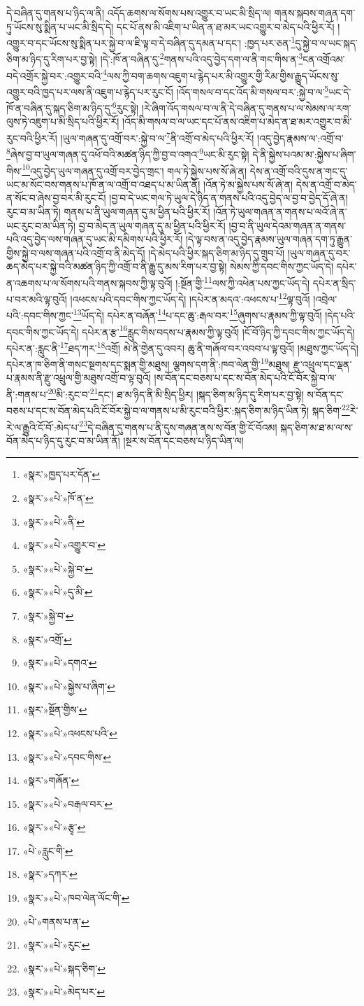 དེ་བཞིན་དུ་གནས་པ་ཉིད་ལ་ནི། འདོད་ཆགས་ལ་སོགས་པས་འགྱུར་བ་ཡང་མི་སྲིད་ལ། གནས་སྐབས་གཞན་དག་ཏུ་ཡོངས་སུ་སྨིན་པ་ཡང་མི་སྲིད་དེ། དང་པོ་ནས་མི་འཇིག་པ་ཡིན་ན་ཐ་མར་ཡང་འགྱུར་བ་མེད་པའི་ཕྱིར་རོ། །འགྱུར་བ་དང་ཡོངས་སུ་སྨིན་པར་སྐྱེ་བ་ལ་ཇི་ལྟ་བ་དེ་བཞིན་དུ་དམན་པ་དང་། :ཁྱད་པར་ཅན་\footnote{«སྣར་»ཁྱད་པར་དོན་}དུ་སྐྱེ་བ་ལ་ཡང་སྐད་ཅིག་མ་ཉིད་དུ་རིག་པར་བྱ་སྟེ། །དེ་:ཁོ་ན་བཞིན་དུ་\footnote{«སྣར་»«པེ་»ཁོ་ན་}གནས་པའི་འདུ་བྱེད་དག་ལ་ནི་གང་གིས་ན་\footnote{«སྣར་»«པེ་»ནི་}ངན་འགྲོའམ་བདེ་འགྲོར་སྐྱེ་བར་:འགྱུར་བའི་\footnote{«སྣར་»«པེ་»འགྱུར་བ་}ལས་ཀྱི་བག་ཆགས་འཇུག་པ་རྙེད་པར་མི་འགྱུར་གྱི་རིམ་གྱིས་རྒྱུད་ཡོངས་སུ་འགྱུར་བའི་ཁྱད་པར་ལས་ནི་འཇུག་པ་རྙེད་པར་རུང་ངོ། །འོད་གསལ་བ་དང་འོད་མི་གསལ་བར་:སྐྱེ་བ་ལ་\footnote{«སྣར་»«པེ་»སྐྱེ་བ་}ཡང་དེ་ཁོ་ན་བཞིན་དུ་སྐད་ཅིག་མ་ཉིད་དུ་\footnote{«སྣར་»«པེ་»དུ་མི་}རུང་སྟེ། །རེ་ཞིག་འོད་གསལ་བ་ལ་ནི་དེ་བཞིན་དུ་གནས་པ་ལ་སེམས་ལ་རག་ལུས་ཏེ་འཇུག་པ་མི་སྲིད་པའི་ཕྱིར་རོ། །འོད་མི་གསལ་བ་ལ་ཡང་དང་པོ་ནས་འཇིག་པ་མེད་ན་ཐ་མར་འགྱུར་བ་མི་རུང་བའི་ཕྱིར་རོ། །ཡུལ་གཞན་དུ་འགྲོ་བར་:སྐྱེ་བ་ལ་\footnote{«སྣར་»སྐྱེ་བ་}ནི་འགྲོ་བ་མེད་པའི་ཕྱིར་རོ། །འདུ་བྱེད་རྣམས་ལ་:འགྲོ་བ་\footnote{«སྣར་»འགྲོ་}ཞེས་བྱ་བ་ཡུལ་གཞན་དུ་འཕོ་བའི་མཚན་ཉིད་ཀྱི་བྱ་བ་འགའ་\footnote{«སྣར་»«པེ་»དགའ་}ཡང་མི་རུང་སྟེ། དེ་ནི་སྐྱེས་པའམ་མ་:སྐྱེས་པ་ཞིག་གིས་\footnote{«སྣར་»«པེ་»སྐྱེས་པ་ཞིག་}འདུ་བྱེད་ཡུལ་གཞན་དུ་འགྲོ་བར་བྱེད་གྲང་། གལ་ཏེ་སྐྱེས་པས་སོ་ཞེ་ན། དེས་ན་འགྲོ་བའི་དུས་ན་གང་དུ་ཡང་མ་སོང་བས་གནས་པ་ཁོ་ན་ལ་འགྲོ་བ་འཐད་པ་མ་ཡིན་ནོ། །འོན་ཏེ་མ་སྐྱེས་པས་སོ་ཞེ་ན། དེས་ན་འགྲོ་བ་མེད་ན་སོང་བ་ཞེས་བྱ་བར་མི་རུང་ངོ། །བྱ་བ་དེ་ཡང་གལ་ཏེ་ཡུལ་དེ་ཉིད་ན་གནས་པའི་འདུ་བྱེད་ལ་བྱ་བ་བྱེད་དོ་ཞེ་ན། རུང་བ་མ་ཡིན་ཏེ། གནས་པ་ནི་ཡུལ་གཞན་དུ་མ་ཕྱིན་པའི་ཕྱིར་རོ། །འོན་ཏེ་ཡུལ་གཞན་ན་གནས་པ་ལའོ་ཞེ་ན་ཡང་རུང་བ་མ་ཡིན་ཏེ། བྱ་བ་མེད་ན་ཡུལ་གཞན་དུ་མ་ཕྱིན་པའི་ཕྱིར་རོ། །བྱ་བ་ནི་ཡུལ་དེའམ་གཞན་ན་གནས་པའི་འདུ་བྱེད་ལས་གཞན་དུ་ཡང་མི་དམིགས་པའི་ཕྱིར་རོ། །དེ་ལྟ་བས་ན་འདུ་བྱེད་རྣམས་ཡུལ་གཞན་དག་ཏུ་རྒྱུན་གྱིས་སྐྱེ་བ་ལས་གཞན་པའི་འགྲོ་བ་ནི་མེད་དོ། །དེ་མེད་པའི་ཕྱིར་སྐད་ཅིག་མ་ཉིད་དུ་གྲུབ་པོ། །ཡུལ་གཞན་དུ་བར་ཆད་མེད་པར་སྐྱེ་བའི་མཚན་ཉིད་ཀྱི་འགྲོ་བ་ནི་རྒྱུ་དུ་མས་རིག་པར་བྱ་སྟེ། སེམས་ཀྱི་དབང་གིས་ཀྱང་ཡོད་དེ། དཔེར་ན་འཆགས་པ་ལ་སོགས་པའི་གནས་སྐབས་ཀྱི་ལྟ་བུའོ། །:སྔོན་གྱི་\footnote{«སྣར་»སྔོན་གྱིས་}ལས་ཀྱི་འཕེན་པས་ཀྱང་ཡོད་དེ། དཔེར་ན་སྲིད་པ་བར་མའི་ལྟ་བུའོ། །འཕངས་པའི་དབང་གིས་ཀྱང་ཡོད་དེ། །དཔེར་ན་མདའ་:འཕངས་པ་\footnote{«སྣར་»«པེ་»འཕངས་པའི་}ལྟ་བུའོ། །འབྲེལ་པའི་:དབང་གིས་ཀྱང་\footnote{«སྣར་»«པེ་»དབང་གིས་}ཡོད་དེ། དཔེར་ན་བཞོན་\footnote{«སྣར་»གཞོན་}པ་དང་ཆུ་:རྒལ་བར་\footnote{«སྣར་»«པེ་»བརྒལ་བར་}ཞུགས་པ་རྣམས་ཀྱི་ལྟ་བུའོ། །དེད་པའི་དབང་གིས་ཀྱང་ཡོད་དེ། དཔེར་ན་རྩ་\footnote{«སྣར་»«པེ་»རྩྭ་}རླུང་གིས་བདས་པ་རྣམས་ཀྱི་ལྟ་བུའོ། །ངོ་བོ་ཉིད་ཀྱི་དབང་གིས་ཀྱང་ཡོད་དེ། དཔེར་ན་:རླུང་ནི་\footnote{«པེ་»རླུང་གི་}ཐད་ཀར་\footnote{«སྣར་»དཀར་}འགྲོ། མེ་ནི་གྱེན་དུ་འབར། ཆུ་ནི་གཞོལ་བར་འབབ་པ་ལྟ་བུའོ། །མཐུས་ཀྱང་ཡོད་དེ། དཔེར་ན་ཁ་ཅིག་ནི་གསང་སྔགས་དང་སྨན་གྱི་མཐུས། ལྕགས་དག་ནི་:ཁབ་ལེན་གྱི་\footnote{«སྣར་»«པེ་»ཁབ་ལེན་ལོང་གི་}མཐུས། རྫུ་འཕྲུལ་དང་ལྡན་པ་རྣམས་ནི་རྫུ་འཕྲུལ་གྱི་མཐུས་འགྲོ་བ་ལྟ་བུའོ། །ས་བོན་དང་བཅས་པ་དང་ས་བོན་མེད་པའི་ངོ་བོར་སྐྱེ་བ་ལ་ནི་:གནས་པ་\footnote{«པེ་»གནས་པ་ན་}མི་:རུང་བ་\footnote{«སྣར་»«པེ་»རུང་}དང་། ཐ་མ་ཉིད་ནི་མི་སྲིད་ཕྱིར། །སྐད་ཅིག་མ་ཉིད་དུ་རིག་པར་བྱ་སྟེ། ས་བོན་དང་བཅས་པ་དང་ས་བོན་མེད་པའི་ངོ་བོར་སྐྱེ་བ་ལ་གནས་པ་མི་རུང་བའི་ཕྱིར་:སྐད་ཅིག་མ་ཉིད་ཡིན་ཏེ། སྐད་ཅིག་\footnote{«སྣར་»«པེ་»སྐད་ཅིག་}རེ་རེ་ལ་རྒྱུའི་ངོ་བོ་:མེད་པ་\footnote{«སྣར་»«པེ་»མེད་པར་}དེ་བཞིན་དུ་གནས་པ་ནི་དུས་གཞན་ནས་ས་བོན་གྱི་ངོ་བོའམ། སྐད་ཅིག་མ་ཐ་མ་ལ་ས་བོན་མེད་པ་ཉིད་དུ་རུང་བ་མ་ཡིན་ནོ། །སྔར་ས་བོན་དང་བཅས་པ་ཉིད་ཡིན་ལ། 